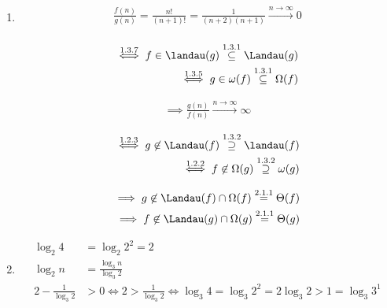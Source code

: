 \begin{solution}

\phantom{}

\begin{comment}

\includegraphicsboxed{Definition 1.4.png}
\includegraphicsboxed{Definition 1.5.png}
\includegraphicsboxed{Lemma 1.2.png}
\includegraphicsboxed{Lemma 1.3.png}

\end{comment}

\begin{enumerate}[label = (\alph*)]

  \item

  \begin{align*}
    \frac{f(n)}{g(n)} = \frac{n!}{(n+1)!} = \frac{1}{(n+2)(n+1)} \xrightarrow{n \to \infty} 0 \\
  \end{align*}

  \begin{align*}
    \stackrel{1.3.7}{\iff}
    f \in \landau(g)
    \stackrel{1.3.1}{\subseteq}
    \Landau(g) \\
    \stackrel{1.3.5}{\iff}
    g \in \omega(f)
    \stackrel{1.3.1}{\subseteq}
    \Omega(f)
  \end{align*}

  \begin{align*}
    \implies
    \frac{g(n)}{f(n)} \xrightarrow{n \to \infty} \infty
  \end{align*}

  \begin{align*}
    \stackrel{1.2.3}{\iff}
    g \not \in \Landau(f)
    \stackrel{1.3.2}{\supseteq}
    \landau(f) \\
    \stackrel{1.2.2}{\iff}
    f \not \in \Omega(g)
    \stackrel{1.3.2}{\supseteq}
    \omega(g)
  \end{align*}

  \begin{align*}
    \implies
    g
    \not \in
    \Landau(f) \cap \Omega(f)
    \stackrel{2.1.1}{=}
    \Theta(f) \\
    \implies
    f
    \not \in
    \Landau(g) \cap \Omega(g)
    \stackrel{2.1.1}{=}
    \Theta(g)
  \end{align*}

  \item

  \begin{align*}
    \log_2{4}               & = \log_2{2^2} = 2 \\
    \log_2{n}               & = \frac{\log_3{n}}{\log_3{2}} \\
    2 - \frac{1}{\log_3{2}} & > 0 \iff 2 > \frac{1}{\log_3{2}} \iff \log_3{4} = \log_3{2^2} = 2 \log_3{2} > 1 = \log_3{3^1}
  \end{align*}


\end{enumerate}
\end{solution}
